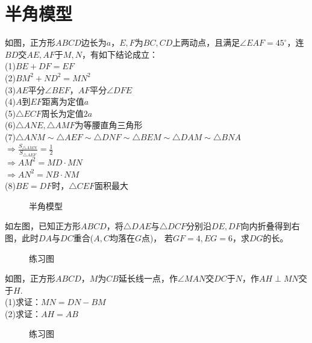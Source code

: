 \section{半角模型}
\begin{definition}
    如图，正方形$ABCD$边长为$a$，$E,F$为$BC,CD$上两动点，且满足$\angle EAF=45^\circ$，连$BD$交$AE,AF$于$M,N$，有如下结论成立：\\
    (1)$BE+DF=EF$ \\
    (2)$BM^2+ND^2=MN^2$ \\
    (3)$AE$平分$\angle BEF$，$AF$平分$\angle DFE$ \\
    (4)$A$到$EF$距离为定值$a$ \\
    (5)$\triangle ECF$周长为定值$2a$ \\
    (6)$\triangle ANE,\triangle AMF$为等腰直角三角形 \\
    (7)$\triangle ANM \sim \triangle AEF \sim \triangle DNF \sim \triangle BEM \sim \triangle DAM \sim \triangle BNA$ \\
    $\Rightarrow \frac{S_{\triangle AMN}}{S_{\triangle AEF}}=\frac{1}{2}$ \\
    $\Rightarrow AM^2=MD·MN$ \\
    $\Rightarrow AN^2=NB·NM$ \\
    (8)$BE=DF$时，$\triangle CEF$面积最大
\end{definition}
\begin{figure}[H]
    \centering
    \resizebox{4cm}{!}{}
    \caption{半角模型}
\end{figure}
\begin{problem}
如左图，已知正方形$ABCD$，将$\triangle DAE$与$\triangle DCF$分别沿$DE,DF$向内折叠得到右图，此时$DA$与$DC$重合($A,C$均落在$G$点)，
若$GF=4,EG=6$，求$DG$的长。
\end{problem}
\begin{figure}[H]
    \centering
    \resizebox{6cm}{!}{}
    \caption{练习图}
\end{figure}
\begin{problem}
如图，正方形$ABCD$，$M$为$CB$延长线一点，作$\angle MAN$交$DC$于$N$，作$AH\perp MN$交于$H$.\\
(1)求证：$MN=DN-BM$ \\
(2)求证：$AH=AB$
\end{problem}
\begin{figure}[H]
    \centering
    \resizebox{2.5cm}{!}{}
    \caption{练习图}
\end{figure}
